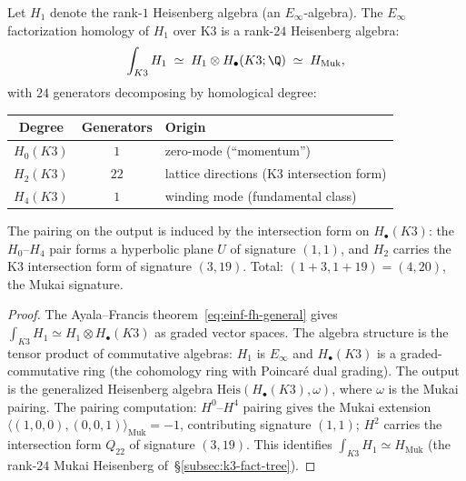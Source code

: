 \begin{proposition}
\label{prop:einf-fh-k3}
Let $H_1$ denote the rank-$1$ Heisenberg algebra (an $E_\infty$-algebra).
The $E_\infty$ factorization homology of $H_1$ over K3 is a rank-$24$ Heisenberg algebra:
\begin{equation}\label{eq:einf-fh-k3-formula}
 \int_{K3} H_1
 \;\simeq\;
 H_1 \otimes H_\bullet(K3; \Q)
 \;\simeq\;
 H_{\mathrm{Muk}},
\end{equation}
with $24$ generators decomposing by homological degree:
\begin{center}
\renewcommand{\arraystretch}{1.2}
\begin{tabular}{ccl}
\toprule
Degree & Generators & Origin \\
\midrule
$H_0(K3)$ & $1$ & zero-mode (``momentum'') \\
$H_2(K3)$ & $22$ & lattice directions (K3 intersection form) \\
$H_4(K3)$ & $1$ & winding mode (fundamental class) \\
\bottomrule
\end{tabular}
\end{center}
The pairing on the output is induced by the intersection form on $H_\bullet(K3)$: the $H_0$--$H_4$ pair forms a hyperbolic plane $U$ of signature $(1,1)$, and $H_2$ carries the K3 intersection form of signature $(3, 19)$.
Total: $(1 + 3, 1 + 19) = (4, 20)$, the Mukai signature.
\end{proposition}

\begin{proof}
The Ayala--Francis theorem~\eqref{eq:einf-fh-general} gives $\int_{K3} H_1 \simeq H_1 \otimes H_\bullet(K3)$ as graded vector spaces.
The algebra structure is the tensor product of commutative algebras: $H_1$ is $E_\infty$ and $H_\bullet(K3)$ is a graded-commutative ring (the cohomology ring with Poincar\'e dual grading).
The output is the generalized Heisenberg algebra $\mathrm{Heis}(H_\bullet(K3), \omega)$, where $\omega$ is the Mukai pairing.
The pairing computation: $H^0$--$H^4$ pairing gives the Mukai extension $\langle (1, 0, 0), (0, 0, 1) \rangle_{\mathrm{Muk}} = -1$, contributing signature $(1, 1)$; $H^2$ carries the intersection form $Q_{22}$ of signature $(3, 19)$.
This identifies $\int_{K3} H_1 \simeq H_{\mathrm{Muk}}$ (the rank-$24$ Mukai Heisenberg of~\S\ref{subsec:k3-fact-tree}).
\end{proof}


